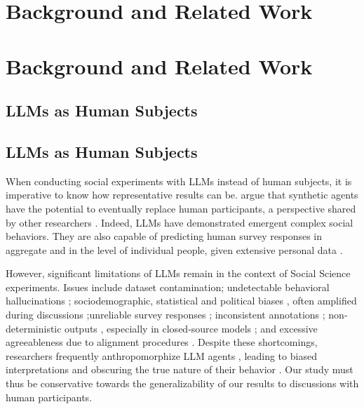 %
\section{Background and Related Work}
\section{Background and Related Work}

\subsection{LLMs as Human Subjects}
\subsection{LLMs as Human Subjects}
\label{ssec:related:human-llm}

When conducting social experiments with \acp{LLM} instead of human subjects, it is imperative to know how representative results can be. \citet{grossman_2023} argue that synthetic agents have the potential to eventually replace human participants, a perspective shared by other researchers \cite{tornberg_2023, argyle2023}. Indeed, \acp{LLM} have demonstrated emergent complex social behaviors\cite{Park2023GenerativeAI, demarzo_2023, leng_2024, abdelnabi_negotiations, abramski_2023}. They are also capable of predicting human survey responses in aggregate \cite{hewitt2024predicting} and in the level of individual people, given extensive personal data \cite{park2024generativeagentsimulations1000}. %

However, significant limitations of \acp{LLM} remain in the context of Social Science experiments. Issues include dataset contamination; undetectable behavioral hallucinations \cite{rossi_2024}; sociodemographic, statistical and political biases \cite{anthis_2025,hewitt2024predicting,rossi_2024}, often amplified during discussions \cite{Taubenfeld2024SystematicBI};unreliable survey responses \cite{jansen_2023,bisbee_2023,neumann_2025}; inconsistent annotations \cite{Gligoric2024CanUL}; non-deterministic outputs \cite{atil_2025}, especially in closed-source models \cite{bisbee_2023}; and excessive agreeableness due to alignment procedures \cite{Park2023GenerativeAI, anthis_2025, rossi_2024}. Despite these shortcomings, researchers frequently anthropomorphize \ac{LLM} agents \cite{rossi_2024}, leading to biased interpretations and obscuring the true nature of their behavior \cite{anthis_2025,zhou-etal-2024-real}. Our study must thus be conservative towards the generalizability of our results to discussions with human participants.

